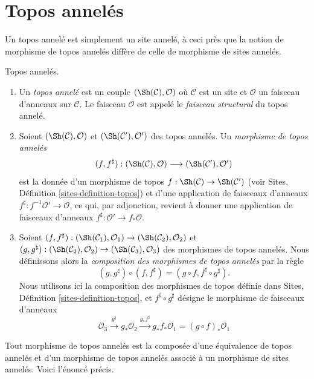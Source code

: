 \section{Topos annelés}
\label{section-ringed-topoi}

\noindent
Un topos annelé est simplement un site annelé, à ceci près que la notion de
morphisme de topos annelés diffère de celle de morphisme de sites annelés.

\begin{definition}
\label{definition-ringed-topos}
Topos annelés.
\begin{enumerate}
\item Un {\it topos annelé} est un couple
$(\Sh(\mathcal{C}), \mathcal{O})$
où $\mathcal{C}$ est un site et $\mathcal{O}$ un faisceau d'anneaux sur
$\mathcal{C}$. Le faisceau $\mathcal{O}$ est appelé le {\it faisceau
structural} du topos annelé.
\item Soient $(\Sh(\mathcal{C}), \mathcal{O})$ et
$(\Sh(\mathcal{C}'), \mathcal{O}')$ des topos annelés. Un {\it morphisme de
topos annelés}
$$
(f, f^\sharp) :
(\Sh(\mathcal{C}), \mathcal{O})
\longrightarrow
(\Sh(\mathcal{C}'), \mathcal{O}')
$$
est la donnée d'un morphisme de topos
$f : \Sh(\mathcal{C}) \to \Sh(\mathcal{C}')$ (voir Sites, Définition
\ref{sites-definition-topos}) et d'une application de faisceaux d'anneaux
$f^\sharp : f^{-1}\mathcal{O}' \to \mathcal{O}$, ce qui, par adjonction,
revient à donner une application de faisceaux d'anneaux
$f^\sharp : \mathcal{O}' \to f_*\mathcal{O}$.
\item Soient
$(f, f^\sharp) :
(\Sh(\mathcal{C}_1), \mathcal{O}_1)
\to (\Sh(\mathcal{C}_2), \mathcal{O}_2)$ et
$(g, g^\sharp) :
(\Sh(\mathcal{C}_2), \mathcal{O}_2) \to
(\Sh(\mathcal{C}_3), \mathcal{O}_3)$
des morphismes de topos annelés. Nous définissons alors la {\it composition des
morphismes de topos annelés} par la règle
$$
(g, g^\sharp) \circ (f, f^\sharp) = (g \circ f, f^\sharp \circ g^\sharp).
$$
Nous utilisons ici la composition des morphismes de topos définie dans Sites,
Définition \ref{sites-definition-topos}, et $f^\sharp \circ g^\sharp$ désigne
le morphisme de faisceaux d'anneaux
$$
\mathcal{O}_3 \xrightarrow{g^\sharp} g_*\mathcal{O}_2
\xrightarrow{g_*f^\sharp} g_*f_*\mathcal{O}_1 = (g \circ f)_*\mathcal{O}_1
$$
\end{enumerate}
\end{definition}

\noindent
Tout morphisme de topos annelés est la composée d'une équivalence de topos
annelés et d'un morphisme de topos annelés associé à un morphisme de sites
annelés. Voici l'énoncé précis.

